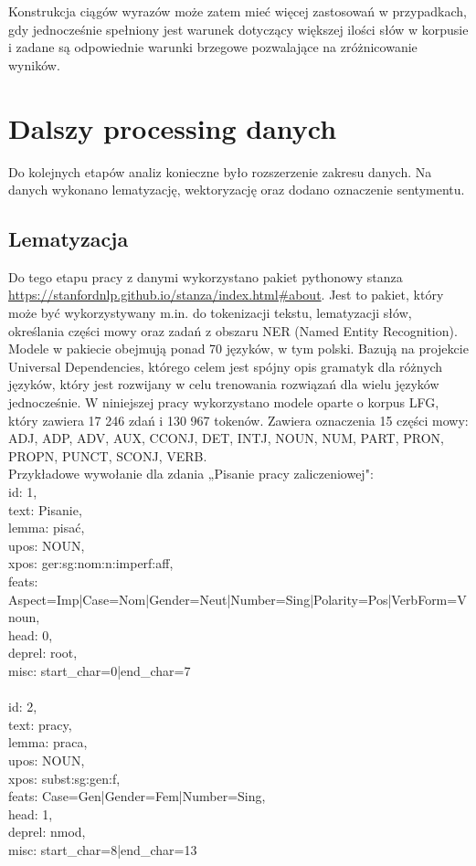 \documentclass[a4paper,11pt,twoside]{report}
\theoremstyle{definition}
\begin{document}
Konstrukcja	ciągów wyrazów może zatem mieć więcej zastosowań w przypadkach, gdy jednocześnie spełniony jest warunek dotyczący większej ilości słów w korpusie i zadane są odpowiednie warunki brzegowe pozwalające na zróżnicowanie wyników.

\chapter{Dalszy processing danych}
Do kolejnych etapów analiz konieczne było rozszerzenie zakresu danych. Na danych wykonano lematyzację, wektoryzację oraz dodano oznaczenie sentymentu.

\section{Lematyzacja} \label{section:lem}
Do tego etapu pracy z danymi wykorzystano pakiet pythonowy stanza \url{https://stanfordnlp.github.io/stanza/index.html#about}. Jest to pakiet, który może być wykorzystywany m.in. do tokenizacji tekstu, lematyzacji słów, określania części mowy oraz zadań z obszaru NER (Named Entity Recognition).  Modele w pakiecie obejmują ponad 70 języków, w tym polski. Bazują na projekcie Universal Dependencies, którego celem jest spójny opis gramatyk dla różnych języków, który jest rozwijany w celu trenowania rozwiązań dla wielu języków jednocześnie.
W niniejszej pracy wykorzystano modele oparte o korpus LFG, który zawiera 17 246 zdań i 130 967 tokenów. Zawiera oznaczenia 15 części mowy: ADJ, ADP, ADV, AUX, CCONJ, DET, INTJ, NOUN, NUM, PART, PRON, PROPN, PUNCT, SCONJ, VERB.\\
Przykładowe wywołanie dla zdania „Pisanie pracy zaliczeniowej":\\
      id: 1,\\
      text: Pisanie,\\
      lemma: pisać,\\
      upos: NOUN,\\
      xpos: ger:sg:nom:n:imperf:aff,\\
      feats: Aspect=Imp|Case=Nom|Gender=Neut|Number=Sing|Polarity=Pos|VerbForm=Vnoun,\\
      head: 0,\\
      deprel: root,\\
      misc: start\_char=0|end\_char=7\\\\

      id: 2,\\
      text: pracy,\\
      lemma: praca,\\
      upos: NOUN,\\
      xpos: subst:sg:gen:f,\\
      feats: Case=Gen|Gender=Fem|Number=Sing,\\
      head: 1,\\
      deprel: nmod,\\
      misc: start\_char=8|end\_char=13\\
\end{document}
